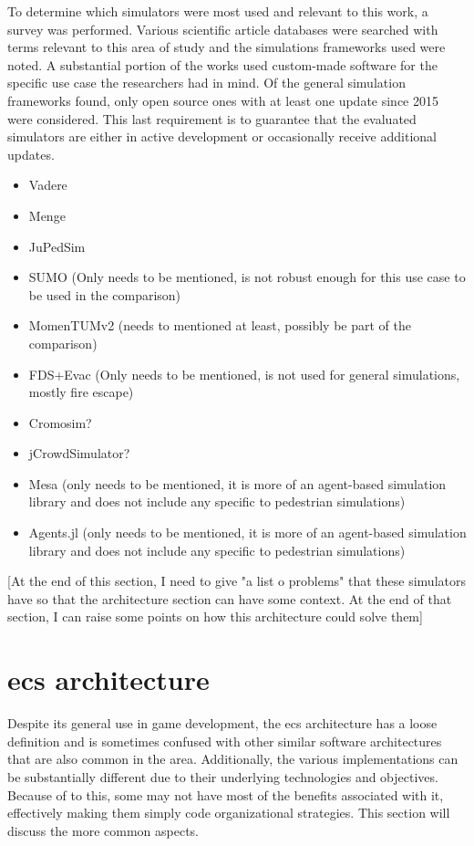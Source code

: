 \documentclass[twoside, 11pt]{article}
\begin{document}
To determine which simulators were most used and relevant to this work, a survey was performed. Various scientific article databases were searched with terms relevant to this area of study and the simulations frameworks used were noted. A substantial portion of the works used custom-made software for the specific use case the researchers had in mind. Of the general simulation frameworks found, only open source ones with at least one update since 2015 were considered. This last requirement is to guarantee that the evaluated simulators are either in active development or occasionally receive additional updates.

\begin{itemize}
  \item Vadere
  \item Menge
  \item JuPedSim
  \item SUMO (Only needs to be mentioned, is not robust enough for this use case to be used in the comparison)
  \item MomenTUMv2 (needs to mentioned at least, possibly be part of the comparison)
  \item FDS+Evac (Only needs to be mentioned, is not used for general simulations, mostly fire escape)
  \item Cromosim?
  \item jCrowdSimulator?
  \item Mesa (only needs to be mentioned, it is more of an agent-based simulation library and does not include any specific to pedestrian simulations)
  \item Agents.jl (only needs to be mentioned, it is more of an agent-based simulation library and does not include any specific to pedestrian simulations)
\end{itemize}

[At the end of this section, I need to give "a list o problems" that these simulators have so that the architecture section can have some context. At the end of that section, I can raise some points on how this architecture could solve them]

\section{\gls{ecs} architecture}

Despite its general use in game development, the \gls{ecs} architecture has a loose definition and is sometimes confused with other similar software architectures that are also common in the area. Additionally, the various implementations can be substantially different due to their underlying technologies and objectives. Because of to this, some may not have most of the benefits associated with it, effectively making them simply code organizational strategies. This section will discuss the more common aspects.
\end{document}
